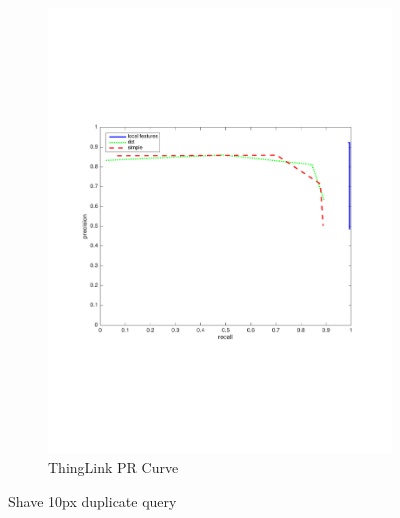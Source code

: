 \documentclass[english,12pt,a4paper,pdftex,elec,utf8, table]{aaltothesis}
\begin{document}
\begin{figure}[htb]
\begin{center}
\begin{subfigure}[b]{0.49\textwidth}
    \includegraphics[width=\textwidth]{figures/thinglink_Shave10pxPR.pdf}
    \caption{ThingLink PR Curve}
    \label{Shaveprthinglink}
  \end{subfigure}
  \caption{Shave 10px duplicate query}
  \end{center}
\end{figure}
\end{document}
